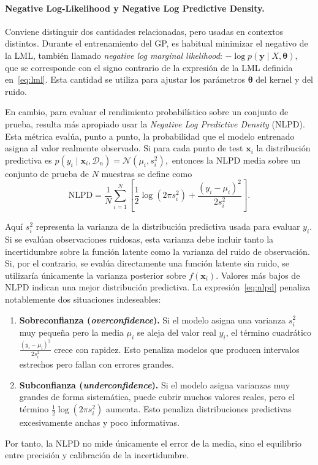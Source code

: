 \paragraph{Negative Log-Likelihood y Negative Log Predictive Density.}

Conviene distinguir dos cantidades relacionadas, pero usadas en contextos distintos. Durante
el entrenamiento del GP, es habitual minimizar el negativo de la LML,
también llamado \emph{negative log marginal likelihood}:
\(
-\log p(\bm{y}\mid X,\bm{\theta}),
\)
que se corresponde con el signo contrario de la expresión de la LML
definida en~\eqref{eq:lml}. Esta cantidad se utiliza para ajustar los parámetros
\(\bm{\theta}\) del kernel y del ruido.

En cambio, para evaluar el rendimiento probabilístico sobre un conjunto de prueba, resulta
más apropiado usar la \emph{Negative Log Predictive Density} (NLPD). Esta métrica evalúa,
punto a punto, la probabilidad que el modelo entrenado asigna al valor realmente observado.
Si para cada punto de test \(\bm{x}_i\) la distribución predictiva es
\(
p(y_i\mid \bm{x}_i,\mathcal{D}_n)=\mathcal{N}(\mu_i,s_i^2),
\)
entonces la NLPD media sobre un conjunto de prueba de \(N\) muestras se define como
\begin{equation}
\mathrm{NLPD}
=
\frac{1}{N}
\sum_{i=1}^{N}
\left[
\frac{1}{2}\log(2\pi s_i^2)
+
\frac{(y_i-\mu_i)^2}{2s_i^2}
\right].
\label{eq:nlpd}
\end{equation}

Aquí \(s_i^2\) representa la varianza de la distribución predictiva usada para evaluar
\(y_i\). Si se evalúan observaciones ruidosas, esta varianza debe incluir tanto la incertidumbre
sobre la función latente como la varianza del ruido de observación. Si, por el contrario, se
evalúa directamente una función latente sin ruido, se utilizaría únicamente la varianza
posterior sobre \(f(\bm{x}_i)\).
Valores más bajos de NLPD indican una mejor distribución predictiva. La
expresión~\eqref{eq:nlpd} penaliza notablemente dos situaciones indeseables:

\begin{enumerate}
    \item \textbf{Sobreconfianza (\emph{overconfidence}).} Si el modelo asigna una varianza
    \(s_i^2\) muy pequeña pero la media \(\mu_i\) se aleja del valor real \(y_i\), el término
    cuadrático
    \(
    \frac{(y_i-\mu_i)^2}{2s_i^2}
    \)
    crece con rapidez. Esto penaliza modelos que producen intervalos estrechos pero fallan
    con errores grandes.

    \item \textbf{Subconfianza (\emph{underconfidence}).} Si el modelo asigna varianzas muy
    grandes de forma sistemática, puede cubrir muchos valores reales, pero el término
    \(
    \frac{1}{2}\log(2\pi s_i^2)
    \)
    aumenta. Esto penaliza distribuciones predictivas excesivamente anchas y poco
    informativas.
\end{enumerate}

Por tanto, la NLPD no mide únicamente el error de la media, sino el equilibrio entre
precisión y calibración de la incertidumbre.
